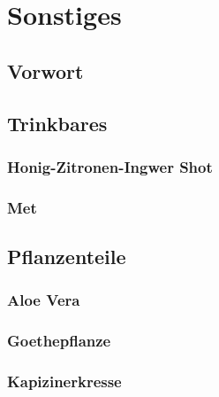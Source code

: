 \chapter{Sonstiges}


\section{Vorwort}



\section{Trinkbares}


\subsection{Honig-Zitronen-Ingwer Shot}


\subsection{Met}



\section{Pflanzenteile}


\subsection{Aloe Vera}


\subsection{Goethepflanze}


\subsection{Kapizinerkresse}